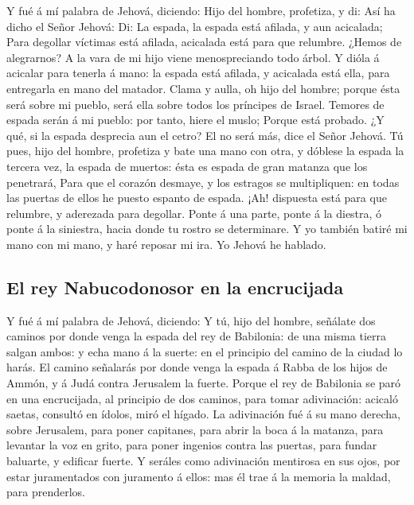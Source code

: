  Y fué á mí palabra de Jehová, diciendo: 
Hijo del hombre, profetiza, y di: Así ha dicho el Señor Jehová: Di: La
espada, la espada está afilada, y aun acicalada;  Para
degollar víctimas está afilada, acicalada está para que relumbre. ¿Hemos
de alegrarnos? A la vara de mi hijo viene menospreciando todo árbol.
 Y dióla á acicalar para tenerla á mano: la espada está
afilada, y acicalada está ella, para entregarla en mano del matador.
 Clama y aulla, oh hijo del hombre; porque ésta será
sobre mi pueblo, será ella sobre todos los príncipes de Israel. Temores
de espada serán á mi pueblo: por tanto, hiere el muslo; 
Porque está probado. ¿Y qué, si la espada desprecia aun el cetro? El no
será más, dice el Señor Jehová.  Tú pues, hijo del
hombre, profetiza y bate una mano con otra, y dóblese la espada la
tercera vez, la espada de muertos: ésta es espada de gran matanza que
los penetrará,  Para que el corazón desmaye, y los
estragos se multipliquen: en todas las puertas de ellos he puesto
espanto de espada. ¡Ah! dispuesta está para que relumbre, y aderezada
para degollar.  Ponte á una parte, ponte á la diestra, ó
ponte á la siniestra, hacia donde tu rostro se determinare.
 Y yo también batiré mi mano con mi mano, y haré reposar
mi ira. Yo Jehová he hablado.

\hypertarget{el-rey-nabucodonosor-en-la-encrucijada}{%
\subsection{El rey Nabucodonosor en la
encrucijada}\label{el-rey-nabucodonosor-en-la-encrucijada}}

 Y fué á mí palabra de Jehová, diciendo: 
Y tú, hijo del hombre, señálate dos caminos por donde venga la espada
del rey de Babilonia: de una misma tierra salgan ambos: y echa mano á la
suerte: en el principio del camino de la ciudad lo harás.
 El camino señalarás por donde venga la espada á Rabba de
los hijos de Ammón, y á Judá contra Jerusalem la fuerte. 
Porque el rey de Babilonia se paró en una encrucijada, al principio de
dos caminos, para tomar adivinación: acicaló saetas, consultó en ídolos,
miró el hígado.  La adivinación fué á su mano derecha,
sobre Jerusalem, para poner capitanes, para abrir la boca á la matanza,
para levantar la voz en grito, para poner ingenios contra las puertas,
para fundar baluarte, y edificar fuerte.  Y seráles como
adivinación mentirosa en sus ojos, por estar juramentados con juramento
á ellos: mas él trae á la memoria la maldad, para prenderlos.

